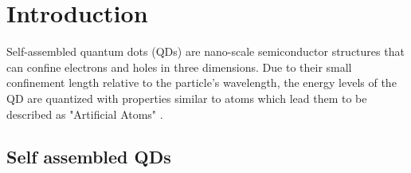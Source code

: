 \section{Introduction}
		Self-assembled quantum dots (QDs) are nano-scale semiconductor structures that can confine electrons and holes in three dimensions. Due to their small confinement length relative to the particle's wavelength, the energy levels of the QD are quantized with properties similar to atoms which lead them to be described as "Artificial Atoms" \cite{Kastner1993}. \\
  	\subsection{Self assembled QDs}

